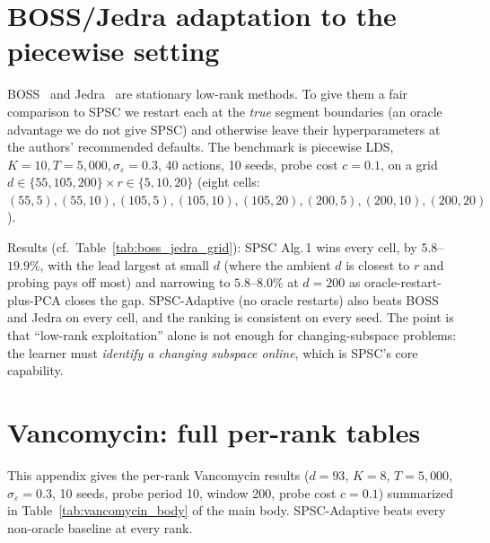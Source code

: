 \documentclass{article}
\begin{document}
\section{BOSS/Jedra adaptation to the piecewise setting}
\label{app:boss_jedra_detail}

BOSS~\citep{duong2024beyond} and Jedra~\citep{jedra2024low} are
stationary low-rank methods. To give them a fair comparison to SPSC
we restart each at the \emph{true} segment boundaries (an oracle
advantage we do not give SPSC) and otherwise leave their
hyperparameters at the authors' recommended defaults. The benchmark
is piecewise LDS, $K{=}10, T{=}5{,}000, \sigma_\varepsilon{=}0.3$, 40
actions, 10 seeds, probe cost $c{=}0.1$, on a grid
$d\in\{55,105,200\}\times r\in\{5,10,20\}$ (eight cells:
$(55,5),(55,10),(105,5),(105,10),(105,20),(200,5),(200,10),(200,20)$).

Results (cf.\ Table~\ref{tab:boss_jedra_grid}): SPSC Alg.\,1 wins
every cell, by $5.8$--$19.9\%$, with the lead largest at small $d$ (where
the ambient $d$ is closest to $r$ and probing pays off most) and
narrowing to $5.8$--$8.0\%$ at $d{=}200$ as oracle-restart-plus-PCA
closes the gap. SPSC-Adaptive (no oracle restarts) also beats BOSS
and Jedra on every cell, and the ranking is consistent on every
seed. The point is that ``low-rank exploitation'' alone is not
enough for changing-subspace problems: the learner must
\emph{identify a changing subspace online}, which is SPSC's core
capability.

\section{Vancomycin: full per-rank tables}
\label{app:vancomycin_full}

This appendix gives the per-rank Vancomycin results
($d{=}93$, $K{=}8$, $T{=}5{,}000$, $\sigma_\varepsilon{=}0.3$, 10
seeds, probe period 10, window 200, probe cost $c{=}0.1$) summarized
in Table~\ref{tab:vancomycin_body} of the main body. SPSC-Adaptive
beats every non-oracle baseline at every rank.
\end{document}
